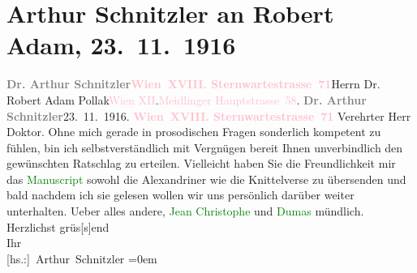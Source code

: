 

               \section[Arthur Schnitzler an Robert Adam, 23. 11. 1916]{ Arthur Schnitzler an Robert Adam, 23. 11. 1916}\nopagebreak{}\rehead{ }\normalsize\beginnumbering{} \toendnotes[C]{\smallbreak\pagebreak[2]} 
\toendnotes[C]{\smallbreak}\pstart{}{\pb}\textcolor{gray}{\textbf{Dr. Arthur Schnitzler}}\pend{}\pstart{}\textcolor{gray}{\textbf{\textcolor{pink}{Wien XVIII. Sternwartestrasse 71}{}\ledrightnote{\textcolor{pink}{Sternwartestraße}}}}\pend{}{\bigskip}\pstart{}{\pb}Herrn Dr. Robert Adam Pollak\pend{}\pstart{}\textcolor{pink}{Wien XII}{}\ledrightnote{\textcolor{pink}{XII., Meidling}}.\pend{}\pstart{}\textcolor{pink}{Meidlinger Hauptstrasse 58}{}\ledrightnote{\textcolor{pink}{Meidlinger Hauptstraße}}.\pend{}{\bigskip}\pstart
           \noindent{}{\pb}\textcolor{gray}{\textbf{Dr. Arthur Schnitzler}}\hfill 23. 11. 1916.\pend
           \pstart
           \textcolor{gray}{\textbf{\textcolor{pink}{Wien XVIII. Sternwartestrasse 71}{}\ledrightnote{\textcolor{pink}{Sternwartestraße}}}}\pend
           \pstart\center{}Verehrter Herr Doktor.\pend\pstart
           Ohne mich gerade in prosodischen Fragen sonderlich kompetent zu fühlen, bin ich
                    selbstverständlich mit Vergnügen bereit Ihnen unverbindlich den gewünschten
                    Ratschlag zu erteilen. Vielleicht haben Sie die Freundlichkeit mir das \textcolor{green}{Manuscript}{} sowohl die
                    Alexandriner wie die Knittelverse zu übersenden und bald nachdem ich sie gelesen
                    wollen wir uns persönlich darüber weiter unterhalten. Ueber alles andere, \textcolor{green}{Jean Christophe}{}\ledrightnote{\textcolor{green}{Jean Christophe}} und \textcolor{blue}{\textcolor{green}{Dumas}{}}{}\ledrightnote{\textcolor{blue}{Alexandre père Dumas}} mündlich.\pend
           \pstart
           Herzlichst grüs{[}s{]}end{\\[\baselineskip]}Ihr{\\[\baselineskip]}\spacefill\mbox{{[}hs.:{]} Arthur Schnitzler}\pend
           \leftskip=0em{}\endnumbering{}  
      
